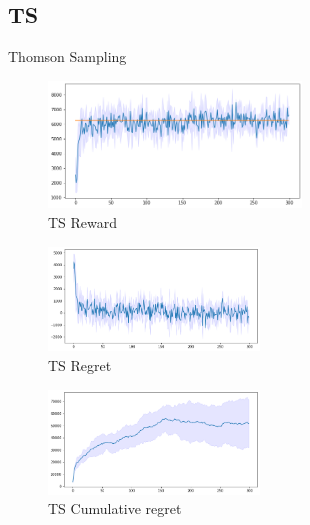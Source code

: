 \subsection{TS}
Thomson Sampling 
\begin{figure}[ht]
    \begin{center}
    \includegraphics[width=0.6\textwidth]{img/TS4.png}
    \caption{TS Reward}
    \label{fig:reward42}
    \end{center}
\end{figure}
\begin{multicols}{2}
    \begin{figure}[H]
        \begin{center}
        \includegraphics[width=0.5\textwidth]{img/TS4_regret.png}
        \caption{TS Regret}
        \label{fig:regret42}
        \end{center}
    \end{figure}
    \columnbreak
    \begin{figure}[H]
        \begin{center}
        \includegraphics[width=0.5\textwidth]{img/TS4_cum_reg.png}
        \caption{TS Cumulative regret}
        \label{fig:cum_reg42}
        \end{center}
    \end{figure}
\end{multicols}